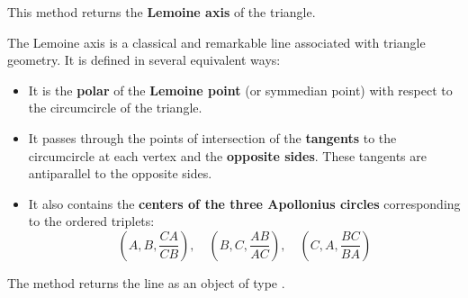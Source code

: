 This method returns the \textbf{Lemoine axis} of the triangle.

\medskip

The Lemoine axis is a classical and remarkable line associated with triangle geometry. It is defined in several equivalent ways:
\begin{itemize}
  \item It is the \textbf{polar} of the \textbf{Lemoine point} (or symmedian point) with respect to the circumcircle of the triangle.
  \item It passes through the points of intersection of the \textbf{tangents} to the circumcircle at each vertex and the \textbf{opposite sides}. These tangents are antiparallel to the opposite sides.
  \item It also contains the \textbf{centers of the three Apollonius circles} corresponding to the ordered triplets:
  \[
    (A, B, \frac{CA}{CB}), \quad (B, C, \frac{AB}{AC}), \quad (C, A, \frac{BC}{BA})
  \]
\end{itemize}


The method  returns the line as an object of type .

\vspace{1em}

\begin{minipage}{.5\textwidth}
\begin{center}
\end{center}

\end{minipage}
\begin{minipage}{.5\textwidth}
\begin{tkzexample}
\end{tkzexample}
\end{minipage}

